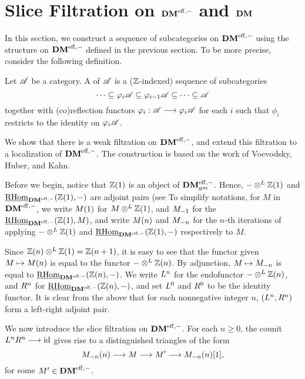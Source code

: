 \newpage
\section{Slice Filtration on $\DMeff$ and $\DM$}\label{sect_slice_filt_dm}

In this section, we construct a sequence of subcategories on 
$\DMeff$ using the structure on $\DMeff$ defined in the previous
section. To be more precise, consider the following definition.

\begin{defn}\label{def_cat_filtration}
Let $\Cat{A}$ be a category. A  of $\Cat{A}$ 
is a ($\Z$-indexed) sequence of subcategories
\[
\cdots \subseteq \phi_i\Cat{A} \subseteq \phi_{i - 1}\Cat{A} 
   \subseteq \cdots \subseteq \Cat{A}
\]
together with (co)reflection functors $\phi_i: \Cat{A} \to 
\phi_i\Cat{A}$ for each $i$ such that $\phi_i$ restricts to 
the identity on $\phi_i\Cat{A}$.
\end{defn}

We show that there is a weak filtration on $\DMeff$, and extend 
this filtration to a localization of $\DMeff$. The construction
is based on the work of Voevodsky, Huber, and Kahn.

Before we begin, notice that $\Z(1)$ is an object of $\DMeffgm$.
Hence, $-\tDM \Z(1)$ and $\ihomDMf(\Z(1), -)$ are adjoint pairs
(see 
To simplify notations, for $M$ in $\DMeff$, we write $\tZ{M}$ 
for $M \tDM \Z(1)$, and $\hZ{M}$ for the $\ihomDMf(\Z(1), M)$,
and write $\tZ[n]{M}$ and $\hZ[n]{M}$ for the $n$-th iterations
of applying $- \tDM \Z(1)$ and $\ihomDMf(\Z(1), -)$ respectively
to $M$. 

Since $\Z(n) \tDM \Z(1) = \Z(n + 1)$, it is easy to see that the 
functor given $M \mapsto \tZ[n]{M}$ is equal to the functor $- 
\tDM \Z(n)$. By adjunction, $M \mapsto \hZ[n]{M}$ is equal to 
$\ihomDMf(\Z(n), -)$. We write $\LDMf{n}$ for the endofunctor $- 
\tDM \Z(n)$, and $\RDMf{n}$ for $\ihomDMf(\Z(n), -)$, and set 
$\LDMf{0}$ and $\RDMf{0}$ to be the identity functor. It is clear 
from the above that for each nonnegative integer $n$, $(\LDMf{n}, 
\RDMf{n})$ form a left-right adjoint pair.

We now introduce the slice filtration on $\DMeff$. For each 
$n \geq 0$, the counit $\LDMf{n}\RDMf{n} \to \id$ gives rise to a 
distinguished triangles of the form
\begin{equation}\label{eq_slice_triangle_1}
\tZ[n]{\hZ[n]{M}} \to M \to M' \to \tZ[n]{\hZ[n]{M}}[1],
\end{equation}
for some $M' \in \DMeff$.

